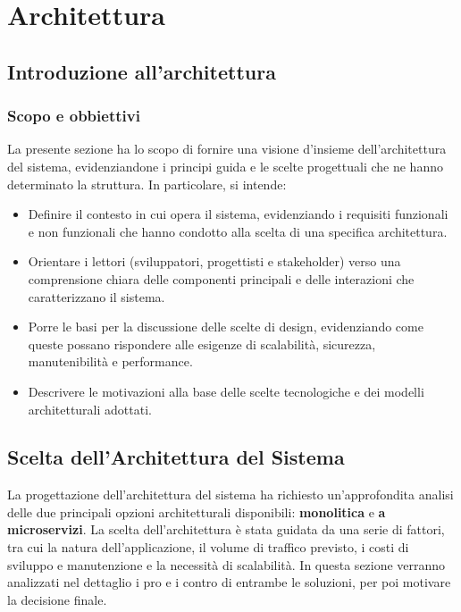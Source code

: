 \section{Architettura}

\subsection{Introduzione all’architettura}
    \subsubsection{Scopo e obbiettivi}
    La presente sezione ha lo scopo di fornire una visione d’insieme dell’architettura del sistema, evidenziandone i principi guida e le scelte progettuali che ne hanno determinato la struttura. In particolare, si intende:
    \begin{itemize}
        \item Definire il contesto in cui opera il sistema, evidenziando i requisiti funzionali e non funzionali che hanno condotto alla scelta di una specifica architettura.
        \item Orientare i lettori (sviluppatori, progettisti e stakeholder) verso una comprensione chiara delle componenti principali e delle interazioni che caratterizzano il sistema.
        \item Porre le basi per la discussione delle scelte di design, evidenziando come queste possano rispondere alle esigenze di scalabilità, sicurezza, manutenibilità e performance.
        \item Descrivere le motivazioni alla base delle scelte tecnologiche e dei modelli architetturali adottati.
    \end{itemize}




\subsection{Scelta dell'Architettura del Sistema}
La progettazione dell’architettura del sistema ha richiesto un’approfondita analisi delle due principali opzioni architetturali disponibili: \textbf{monolitica} e \textbf{a microservizi}. La scelta dell’architettura è stata guidata da una serie di fattori, tra cui la natura dell’applicazione, il volume di traffico previsto, i costi di sviluppo e manutenzione e la necessità di scalabilità. In questa sezione verranno analizzati nel dettaglio i pro e i contro di entrambe le soluzioni, per poi motivare la decisione finale.

